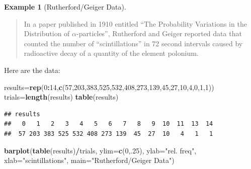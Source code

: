 \documentclass[
]{book}
\newenvironment{Shaded}{\begin{snugshade}}{\end{snugshade}}
\newcommand{\AttributeTok}[1]{\textcolor[rgb]{0.13,0.29,0.53}{#1}}
\newcommand{\DecValTok}[1]{\textcolor[rgb]{0.00,0.00,0.81}{#1}}
\newcommand{\FunctionTok}[1]{\textcolor[rgb]{0.13,0.29,0.53}{\textbf{#1}}}
\newcommand{\NormalTok}[1]{#1}
\newcommand{\OtherTok}[1]{\textcolor[rgb]{0.56,0.35,0.01}{#1}}
\newcommand{\SpecialCharTok}[1]{\textcolor[rgb]{0.81,0.36,0.00}{\textbf{#1}}}
\newcommand{\StringTok}[1]{\textcolor[rgb]{0.31,0.60,0.02}{#1}}
\theoremstyle{definition}
\theoremstyle{definition}
\newtheorem{example}{Example}[chapter]
\theoremstyle{definition}
\theoremstyle{definition}
\theoremstyle{remark}
\begin{document}
\begin{example}[Rutherford/Geiger Data]
\protect\hypertarget{exm:pois-rutherford-geiger-R}{}\label{exm:pois-rutherford-geiger-R}\leavevmode

\begin{quote}
In a paper published in 1910 entitled ``The Probability Variations in the Distribution of \(\alpha\)-particles'', Rutherford and Geiger reported data that counted the number of ``scintillations'' in 72 second intervals caused by radioactive decay of a quantity of the element polonium.
\end{quote}

Here are the data:

\begin{Shaded}
\begin{Highlighting}[]
\NormalTok{results}\OtherTok{=}\FunctionTok{rep}\NormalTok{(}\DecValTok{0}\SpecialCharTok{:}\DecValTok{14}\NormalTok{,}\FunctionTok{c}\NormalTok{(}\DecValTok{57}\NormalTok{,}\DecValTok{203}\NormalTok{,}\DecValTok{383}\NormalTok{,}\DecValTok{525}\NormalTok{,}\DecValTok{532}\NormalTok{,}\DecValTok{408}\NormalTok{,}\DecValTok{273}\NormalTok{,}\DecValTok{139}\NormalTok{,}\DecValTok{45}\NormalTok{,}\DecValTok{27}\NormalTok{,}\DecValTok{10}\NormalTok{,}\DecValTok{4}\NormalTok{,}\DecValTok{0}\NormalTok{,}\DecValTok{1}\NormalTok{,}\DecValTok{1}\NormalTok{))}
\NormalTok{trials}\OtherTok{=}\FunctionTok{length}\NormalTok{(results)}
\FunctionTok{table}\NormalTok{(results)}
\end{Highlighting}
\end{Shaded}

\begin{verbatim}
## results
##   0   1   2   3   4   5   6   7   8   9  10  11  13  14 
##  57 203 383 525 532 408 273 139  45  27  10   4   1   1
\end{verbatim}

\begin{Shaded}
\begin{Highlighting}[]
\FunctionTok{barplot}\NormalTok{(}\FunctionTok{table}\NormalTok{(results)}\SpecialCharTok{/}\NormalTok{trials,}
        \AttributeTok{ylim=}\FunctionTok{c}\NormalTok{(}\DecValTok{0}\NormalTok{,.}\DecValTok{25}\NormalTok{),}
        \AttributeTok{ylab=}\StringTok{"rel. freq"}\NormalTok{,}
        \AttributeTok{xlab=}\StringTok{"scintillations"}\NormalTok{,}
        \AttributeTok{main=}\StringTok{"Rutherford/Geiger Data"}\NormalTok{)}
\end{Highlighting}
\end{Shaded}


\end{example}
\end{document}
